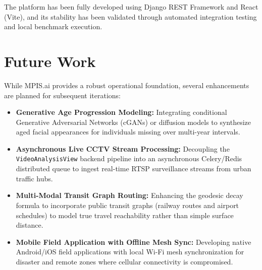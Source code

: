 \documentclass[12pt,a4paper]{report}
\begin{document}
The platform has been fully developed using Django REST Framework and React (Vite), and its stability has been validated through automated integration testing and local benchmark execution.

\section{Future Work}
While MPIS.ai provides a robust operational foundation, several enhancements are planned for subsequent iterations:
\begin{itemize}
    \item \textbf{Generative Age Progression Modeling:} Integrating conditional Generative Adversarial Networks (cGANs) or diffusion models to synthesize aged facial appearances for individuals missing over multi-year intervals.
    \item \textbf{Asynchronous Live CCTV Stream Processing:} Decoupling the \texttt{VideoAnalysisView} backend pipeline into an asynchronous Celery/Redis distributed queue to ingest real-time RTSP surveillance streams from urban traffic hubs.
    \item \textbf{Multi-Modal Transit Graph Routing:} Enhancing the geodesic decay formula to incorporate public transit graphs (railway routes and airport schedules) to model true travel reachability rather than simple surface distance.
    \item \textbf{Mobile Field Application with Offline Mesh Sync:} Developing native Android/iOS field applications with local Wi-Fi mesh synchronization for disaster and remote zones where cellular connectivity is compromised.
\end{itemize}
\end{document}
